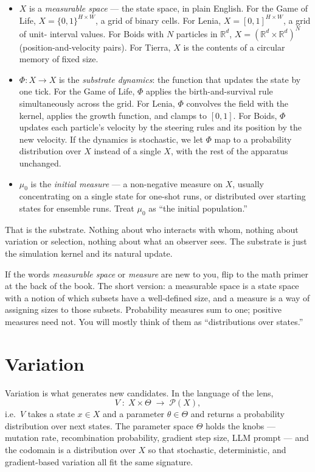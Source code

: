 \begin{itemize}[leftmargin=1.5em,itemsep=2pt]
  \item $X$ is a \emph{measurable space} --- the state space, in plain
    English. For the Game of Life, $X = \{0,1\}^{H\times W}$, a grid of
    binary cells. For Lenia, $X = [0,1]^{H\times W}$, a grid of unit-
    interval values. For Boids with $N$ particles in $\mathbb{R}^d$,
    $X = (\mathbb{R}^d \times \mathbb{R}^d)^N$ (position-and-velocity
    pairs). For Tierra, $X$ is the contents of a circular memory of
    fixed size.
  \item $\Phi : X \to X$ is the \emph{substrate dynamics}: the function
    that updates the state by one tick. For the Game of Life, $\Phi$
    applies the birth-and-survival rule simultaneously across the grid.
    For Lenia, $\Phi$ convolves the field with the kernel, applies the
    growth function, and clamps to $[0,1]$. For Boids, $\Phi$ updates
    each particle's velocity by the steering rules and its position by
    the new velocity. If the dynamics is stochastic, we let $\Phi$ map
    to a probability distribution over $X$ instead of a single $X$, with
    the rest of the apparatus unchanged.
  \item $\mu_0$ is the \emph{initial measure} --- a non-negative measure
    on $X$, usually concentrating on a single state for one-shot runs,
    or distributed over starting states for ensemble runs. Treat $\mu_0$
    as ``the initial population.''
\end{itemize}

That is the substrate. Nothing about who interacts with whom, nothing
about variation or selection, nothing about what an observer sees. The
substrate is just the simulation kernel and its natural update.

If the words \emph{measurable space} or \emph{measure} are new to you,
flip to the math primer at the back of the book. The short version: a
measurable space is a state space with a notion of which subsets have a
well-defined size, and a measure is a way of assigning sizes to those
subsets. Probability measures sum to one; positive measures need not.
You will mostly think of them as ``distributions over states.''

\section{Variation}

Variation is what generates new candidates. In the language of the lens,
\[
  V \;:\; X \times \Theta \;\to\; \mathcal{P}(X),
\]
i.e.\ $V$ takes a state $x \in X$ and a parameter $\theta \in \Theta$ and
returns a probability distribution over next states. The parameter space
$\Theta$ holds the knobs --- mutation rate, recombination probability,
gradient step size, LLM prompt --- and the codomain is a distribution
over $X$ so that stochastic, deterministic, and gradient-based variation
all fit the same signature.

